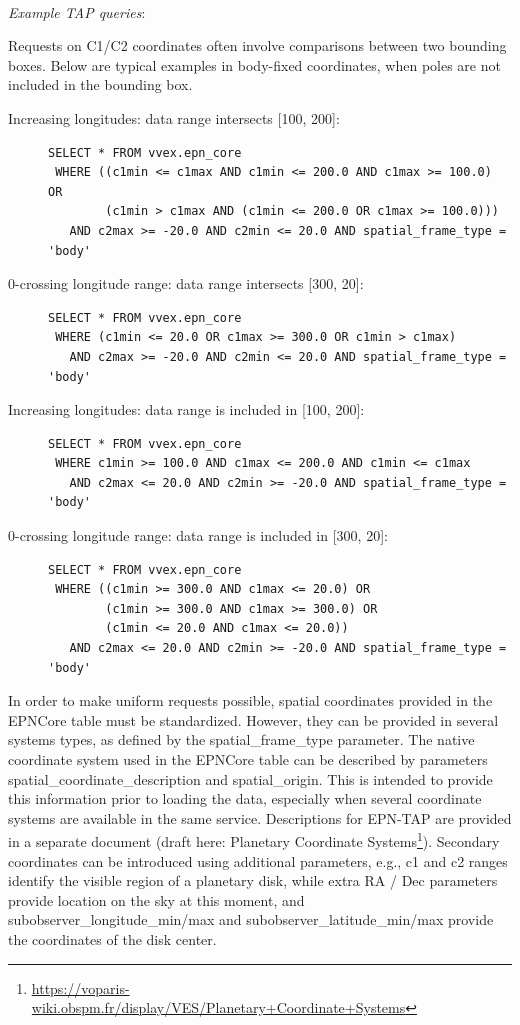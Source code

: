 \documentclass[11pt,a4paper]{ivoa}
\begin{document}
\textbf{\\}
\emph{Example TAP queries}:

Requests on C1/C2 coordinates often involve comparisons between two
bounding boxes. Below are typical examples in body-fixed coordinates,
when poles are not included in the bounding box.
\begin{description}
\item[Increasing longitudes: data range intersects {[100, 200]}:]\mbox{}
\begin{verbatim}
SELECT * FROM vvex.epn_core
 WHERE ((c1min <= c1max AND c1min <= 200.0 AND c1max >= 100.0) OR
        (c1min > c1max AND (c1min <= 200.0 OR c1max >= 100.0)))
   AND c2max >= -20.0 AND c2min <= 20.0 AND spatial_frame_type = 'body'
\end{verbatim}

\item[0-crossing longitude range: data range intersects {[300, 20]}:]\mbox{}
\begin{verbatim}
SELECT * FROM vvex.epn_core
 WHERE (c1min <= 20.0 OR c1max >= 300.0 OR c1min > c1max)
   AND c2max >= -20.0 AND c2min <= 20.0 AND spatial_frame_type = 'body'
\end{verbatim}

\item[Increasing longitudes: data range is included in {[100, 200]}:]\mbox{}
\begin{verbatim}
SELECT * FROM vvex.epn_core
 WHERE c1min >= 100.0 AND c1max <= 200.0 AND c1min <= c1max
   AND c2max <= 20.0 AND c2min >= -20.0 AND spatial_frame_type = 'body'
\end{verbatim}

\item[0-crossing longitude range: data range is included in {[300, 20]}:]\mbox{}
\begin{verbatim}
SELECT * FROM vvex.epn_core
 WHERE ((c1min >= 300.0 AND c1max <= 20.0) OR
        (c1min >= 300.0 AND c1max >= 300.0) OR
        (c1min <= 20.0 AND c1max <= 20.0))
   AND c2max <= 20.0 AND c2min >= -20.0 AND spatial_frame_type = 'body'
\end{verbatim}
\end{description}

In order to make uniform requests possible, spatial coordinates provided
in the EPNCore table must be standardized. However, they can be provided
in several systems types, as defined by the spatial\_frame\_type
parameter. The native coordinate system used in the EPNCore table can
be described by parameters spatial\_coordinate\_description and
spatial\_origin. This is intended to provide this information
prior to loading the data, especially when several coordinate
systems are available in the same service. Descriptions for EPN-TAP
are provided in a separate document (draft here: Planetary Coordinate
Systems\footnote{\url{https://voparis-wiki.obspm.fr/display/VES/Planetary+Coordinate+Systems}}).
Secondary coordinates can be introduced using additional parameters,
e.g., c1 and c2 ranges identify the visible region of a planetary
disk, while extra RA / Dec parameters provide location on the
sky at this moment, and subobserver\_longitude\_min/max and
subobserver\_latitude\_min/max provide the coordinates of the disk center.
\end{document}
